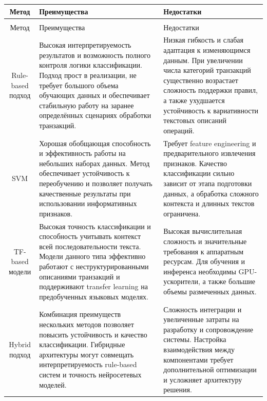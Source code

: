 \documentclass[14pt,a4paper]{extarticle}
\begin{document}
\begin{tabularx}{\textwidth}{|C|X|X|}

\caption{Сравнение подходов к классификации транзакций.} \label{tab:class_types} \\

\hline
Метод &
Преимущества &
Недостатки \\ \hline
\endfirsthead

\caption{Сравнение подходов к классификации транзакций.} \\
\hline
Метод &
Преимущества &
Недостатки \\ \hline
\endhead

Rule-based подход &
Высокая интерпретируемость результатов и возможность полного контроля логики классификации. 
Подход прост в реализации, не требует большого объема обучающих данных и обеспечивает стабильную работу на заранее определённых сценариях обработки транзакций. &
Низкая гибкость и слабая адаптация к изменяющимся данным. 
При увеличении числа категорий транзакций существенно возрастает сложность поддержки правил, а также ухудшается устойчивость к вариативности текстовых описаний операций. \\ \hline

SVM &
Хорошая обобщающая способность и эффективность работы на небольших наборах данных. 
Метод обеспечивает устойчивость к переобучению и позволяет получать качественные результаты при использовании информативных признаков. &
Требует feature engineering и предварительного извлечения признаков. 
Качество классификации сильно зависит от этапа подготовки данных, а обработка сложного контекста и длинных текстов ограничена. \\ \hline

TF-based модели &
Высокая точность классификации и способность учитывать контекст всей последовательности текста. 
Модели данного типа эффективно работают с неструктурированными описаниями транзакций и поддерживают transfer learning на предобученных языковых моделях. &
Высокая вычислительная сложность и значительные требования к аппаратным ресурсам. 
Для обучения и инференса необходимы GPU-ускорители, а также большие объемы размеченных данных. \\ \hline

Hybrid подход &
Комбинация преимуществ нескольких методов позволяет повысить устойчивость и качество классификации. 
Гибридные архитектуры могут совмещать интерпретируемость rule-based систем и точность нейросетевых моделей. &
Сложность интеграции и увеличенные затраты на разработку и сопровождение системы. 
Настройка взаимодействия между компонентами требует дополнительной оптимизации и усложняет архитектуру решения. \\ \hline

\end{tabularx}
\end{document}
